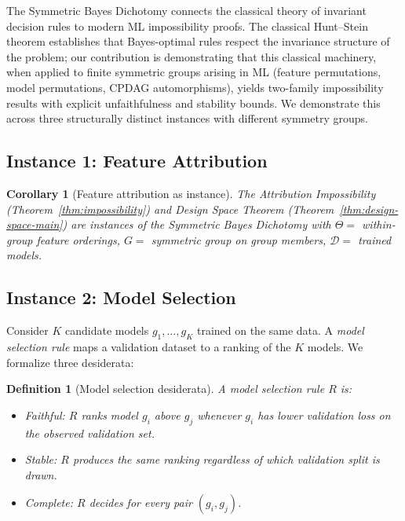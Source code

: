 \documentclass{article}
\newtheorem{corollary}[theorem]{Corollary}
\newtheorem{definition}[theorem]{Definition}
\begin{document}
\begin{sloppypar}
The Symmetric Bayes Dichotomy connects the classical theory of invariant decision
rules \citep{lehmann2005testing,hunt1946} to modern ML impossibility proofs. The
classical Hunt--Stein theorem establishes that Bayes-optimal rules respect the
invariance structure of the problem; our contribution is demonstrating that this
classical machinery, when applied to finite symmetric groups arising in ML (feature
permutations, model permutations, CPDAG automorphisms), yields two-family
impossibility results with explicit unfaithfulness and stability bounds. We
demonstrate this across three structurally distinct instances with different
symmetry groups.
\end{sloppypar}

\subsection{Instance 1: Feature Attribution}

\begin{corollary}[Feature attribution as instance]
\label{cor:attribution-instance}
The Attribution Impossibility (Theorem~\ref{thm:impossibility}) and Design Space Theorem (Theorem~\ref{thm:design-space-main}) are instances of the Symmetric Bayes Dichotomy with $\Theta =$ within-group feature orderings, $G =$ symmetric group on group members, $\mathcal{D} =$ trained models.
\end{corollary}

\subsection{Instance 2: Model Selection}

Consider $K$ candidate models $g_1, \ldots, g_K$ trained on the same data. A \emph{model selection rule} maps a validation dataset to a ranking of the $K$ models. We formalize three desiderata:

\begin{definition}[Model selection desiderata]
A model selection rule $R$ is:
\begin{itemize}
    \item \emph{Faithful}: $R$ ranks model $g_i$ above $g_j$ whenever $g_i$ has lower validation loss on the observed validation set.
    \item \emph{Stable}: $R$ produces the same ranking regardless of which validation split is drawn.
    \item \emph{Complete}: $R$ decides for every pair $(g_i, g_j)$.
\end{itemize}
\end{definition}
\end{document}
